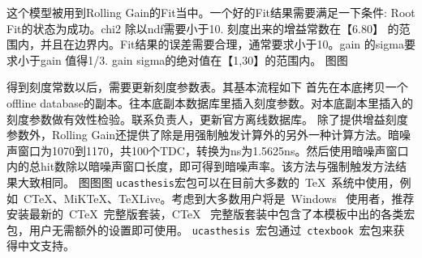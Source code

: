 这个模型被用到Rolling Gain的Fit当中。一个好的Fit结果需要满足一下条件:
Root Fit的状态为成功。chi2 除以ndf需要小于10. 刻度出来的增益常数在【6.80】 的范围内，并且在边界内。Fit结果的误差需要合理，通常要求小于10。gain 的sigma要求小于gain 值得1/3. gain sigma的绝对值在【1,30】的范围内。
图图




得到刻度常数以后，需要更新刻度参数表。其基本流程如下
首先在本底拷贝一个offline database的副本。往本底副本数据库里插入刻度参数。对本底副本里插入的刻度参数做有效性检验。联系负责人，更新官方离线数据库。
除了提供增益刻度参数外，Rolling Gain还提供了除是用强制触发计算外的另外一种计算方法。暗噪声窗口为1070到1170，共100个TDC，转换为ns为1.5625ns。然后使用暗噪声窗口内的总hit数除以暗噪声窗口长度，即可得到暗噪声率。该方法与强制触发方法结果大致相同。
图图图
\texttt{ucasthesis}宏包可以在目前大多数的~\TeX{}~系统中使用，例如~C\TeX{}、MiK\TeX{}、\TeX{}Live。考虑到大多数用户将是~Windows~ 使用者，推荐安装最新的~C\TeX{}~完整版套装，C\TeX{}~ 完整版套装中包含了本模板中出的各类宏包，用户无需额外的设置即可使用。 \texttt{ucasthesis}~宏包通过~\texttt{ctexbook}~宏包来获得中文支持。
